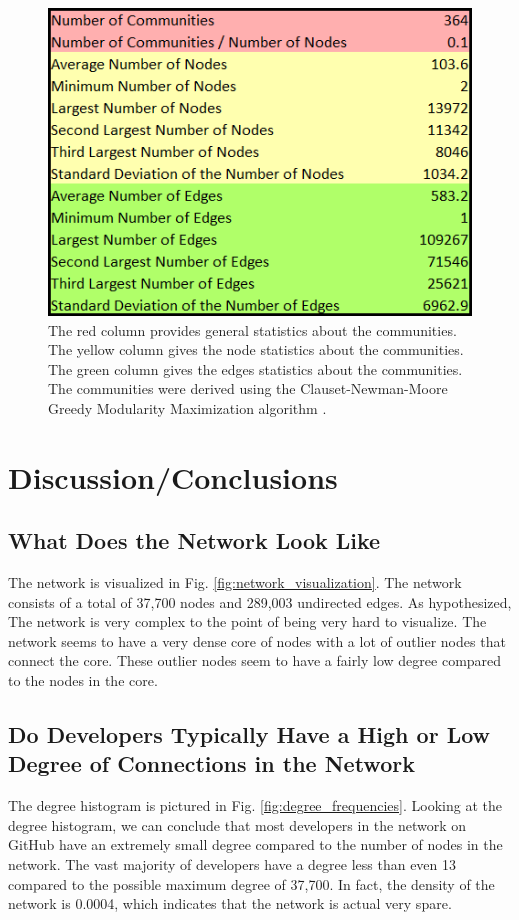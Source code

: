\documentclass[9pt,twocolumn,twoside]{pnas-new}
\begin{document}
\begin{figure}
\centering
\includegraphics[width=.8\linewidth]{community_table}
\caption{The red column provides general statistics about the communities. The yellow column gives the node statistics about the communities. The green column gives the edges statistics about the communities. The communities were derived using the Clauset-Newman-Moore Greedy Modularity Maximization algorithm \cite{networkxcommunities}.
}
\label{fig:community_table}
\end{figure}

\section{Discussion/Conclusions}

\subsection{What Does the Network Look Like}

The network is visualized in Fig. \ref{fig:network_visualization}. The network consists of a total of 37,700 nodes and 289,003 undirected edges. As hypothesized, The network is very complex to the point of being very hard to visualize. The network seems to have a very dense core of nodes with a lot of outlier nodes that connect the core. These outlier nodes seem to have a fairly low degree compared to the nodes in the core.

\subsection{Do Developers Typically Have a High or Low Degree of Connections in the Network}

The degree histogram is pictured in Fig. \ref{fig:degree_frequencies}. Looking at the degree histogram, we can conclude that most developers in the network on GitHub have an extremely small degree compared to the number of nodes in the network. The vast majority of developers have a degree less than even 13 compared to the possible maximum degree of 37,700. In fact, the density of the network is 0.0004, which indicates that the network is actual very spare.
\end{document}
